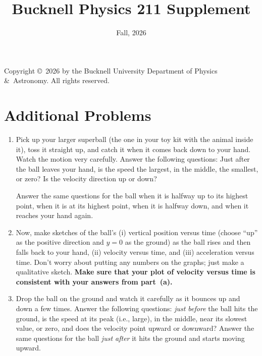 

\frontmatter

\mbox{}
\vspace{7in}


Copyright \copyright\ 2026 by the Bucknell University Department of
Physics \&\ Astronomy.
All rights reserved. 




\title{Bucknell Physics 211 Supplement}\author{Fall, 2026}

\chapter*{Additional Problems}

\begin{exercise}
  \begin{enumerate}
  \item Pick up your larger superball (the one in your toy kit with
    the animal inside it), toss it straight up, and catch it
    when it comes back down to your hand.  Watch the motion very
    carefully.  Answer the following questions: Just after the ball
    leaves your hand, is the speed the largest, in the middle, the
    smallest, or zero? Is the velocity direction up or down?

    Answer the same questions for the ball when it is halfway up to
    its highest point, when it is at its highest point, when it is
    halfway down, and when it reaches your hand again.
 
  \item Now, make sketches of the ball's (i) vertical position versus
    time (choose ``up'' as the positive direction and $y = 0$ as the
    ground) as the ball rises and then falls back to your hand, (ii)
    velocity versus time, and (iii) acceleration versus time.  Don't
    worry about putting any numbers on the graphs; just make a
    qualitative sketch.  \textbf{Make sure that your plot of velocity
    versus time is consistent with your answers from part~(a).}

  \item Drop the ball on the ground and watch it carefully as it
    bounces up and down a few times.  Answer the following questions:
    \emph{just before} the ball hits the ground, is the speed at its
    peak (i.e., large), in the middle, near its slowest value, or
    zero, and does the velocity point upward or downward?  Answer the
    same questions for the ball \emph{just after} it hits the ground
    and starts moving upward.


\end{enumerate}
\end{exercise}
